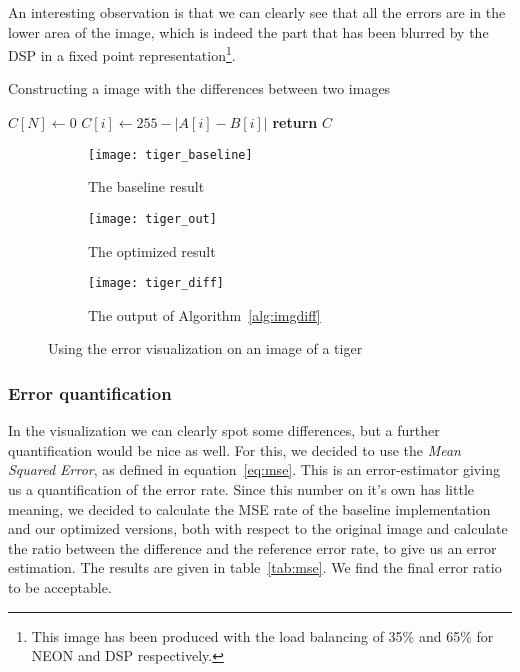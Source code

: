 An interesting observation is that we can clearly see that all the errors are in the lower area of the image, which is indeed the part that has been blurred by the DSP in a fixed point representation\footnote{This image has been produced with the load balancing of 35\% and 65\% for NEON and DSP respectively.}.

\begin{algorithm}[t]
    \caption{Constructing a image with the differences between two images}\label{alg:imgdiff}
    \begin{algorithmic}[1]
          
        \State $C[N]\gets 0$
           \State $C[i]\gets 255 - |A[i] - B[i]|$   
        \EndFor
        \State \textbf{return} $C$
        \EndProcedure
    \end{algorithmic}
\end{algorithm}

\begin{figure*}
    \centering
    \begin{subfigure}[b]{0.3\textwidth}
            \texttt{[image: tiger\_baseline]}
            \caption{The baseline result}
            \label{fig:er_tiger_baseline}
    \end{subfigure}
    \begin{subfigure}[b]{0.3\textwidth}
            \texttt{[image: tiger\_out]}
            \caption{The optimized result}
            \label{fig:er_tiger_out}
    \end{subfigure}
    \begin{subfigure}[b]{0.3\textwidth}
            \texttt{[image: tiger\_diff]}
            \caption{The output of Algorithm~\ref{alg:imgdiff}}
            \label{fig:er_tiger_diff}
    \end{subfigure}
    \caption{Using the error visualization on an image of a tiger}
    \label{fig:imgdiff}
\end{figure*}

\subsubsection{Error quantification}
In the visualization we can clearly spot some differences, but a further quantification would be nice as well. For this, we decided to use the \emph{Mean Squared Error}, as defined in equation~\ref{eq:mse}. This is an error-estimator giving us a quantification of the error rate. Since this number on it's own has little meaning, we decided to calculate the MSE rate of the baseline implementation and our optimized versions, both with respect to the original image and calculate the ratio between the difference and the reference error rate, to give us an error estimation. The results are given in table~\ref{tab:mse}. We find the final error ratio to be acceptable.

